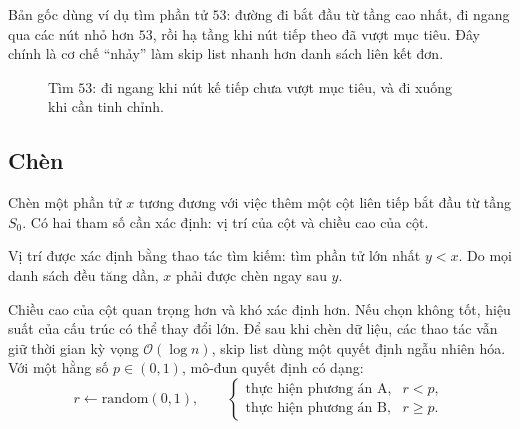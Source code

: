 \documentclass[11pt]{article}
\newcommand{\Oh}{\mathcal{O}}
\begin{document}
Bản gốc dùng ví dụ tìm phần tử \(53\): đường đi bắt đầu từ tầng cao nhất, đi
ngang qua các nút nhỏ hơn \(53\), rồi hạ tầng khi nút tiếp theo đã vượt mục
tiêu. Đây chính là cơ chế ``nhảy'' làm skip list nhanh hơn danh sách liên kết
đơn.

\begin{figure}[ht]
\centering
{}
\caption{Tìm \(53\): đi ngang khi nút kế tiếp chưa vượt mục tiêu, và đi xuống khi cần tinh chỉnh.}
\end{figure}

\subsection{Chèn}

Chèn một phần tử \(x\) tương đương với việc thêm một cột liên tiếp bắt đầu từ
tầng \(S_0\). Có hai tham số cần xác định: vị trí của cột và chiều cao của cột.

Vị trí được xác định bằng thao tác tìm kiếm: tìm phần tử lớn nhất \(y<x\).
Do mọi danh sách đều tăng dần, \(x\) phải được chèn ngay sau \(y\).

Chiều cao của cột quan trọng hơn và khó xác định hơn. Nếu chọn không tốt,
hiệu suất của cấu trúc có thể thay đổi lớn. Để sau khi chèn dữ liệu, các thao
tác vẫn giữ thời gian kỳ vọng \(\Oh(\log n)\), skip list dùng một quyết định
ngẫu nhiên hóa. Với một hằng số \(p\in(0,1)\), mô-đun quyết định có dạng:
\[
  r\leftarrow \mathrm{random}(0,1),\qquad
  \begin{cases}
    \text{thực hiện phương án A}, & r<p,\\
    \text{thực hiện phương án B}, & r\ge p.
  \end{cases}
\]
\end{document}
